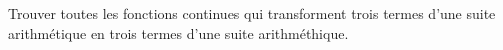 Trouver toutes les fonctions continues qui transforment trois termes d'une suite arithmétique en trois termes d'une suite arithméthique.
